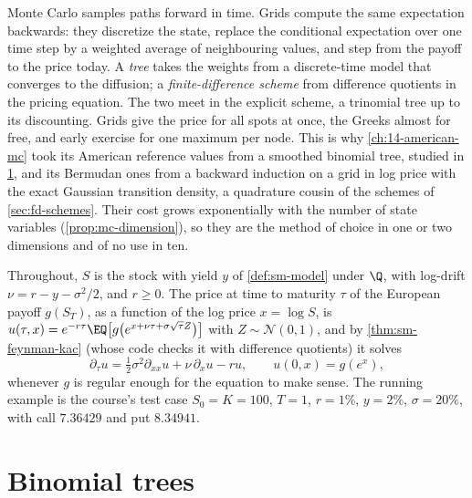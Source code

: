
Monte Carlo samples paths forward in time. Grids compute the same expectation backwards:
they discretize the state, replace the conditional expectation over one time step by a
weighted average of neighbouring values, and step from the payoff to the price today. A
\emph{tree} takes the weights from a discrete-time model that converges to the diffusion; a
\emph{finite-difference scheme} from difference quotients in the pricing equation. The two meet
in the explicit scheme, a trinomial tree up to its discounting. Grids give the price for all spots at once,
the Greeks almost for free, and early exercise for one maximum per node. This is why \cref{ch:14-american-mc} took its American reference values
from a smoothed binomial tree, studied in \cref{sec:fd-binomial}, and its Bermudan ones from a
backward induction on a grid in log price with the exact Gaussian transition density, a
quadrature cousin of the schemes of \cref{sec:fd-schemes}. Their cost grows exponentially with the number
of state variables (\cref{prop:mc-dimension}), so they are the method of choice in one or two
dimensions and of no use in ten.

Throughout, $S$ is the stock with yield $y$ of \cref{def:sm-model} under $\Q$, with log-drift
$\nu=r-y-\sigma^2/2$, and $r\ge0$. The price at time to maturity $\tau$ of the European payoff
$g(S_T)$, as a function of the log price $x=\log S$, is
$u(\tau,x)=e^{-r\tau}\EQ\big[g\big(e^{x+\nu\tau+\sigma\sqrt\tau Z}\big)\big]$ with $Z\sim\mathcal N(0,1)$, and by
\cref{thm:sm-feynman-kac} (whose code checks it with difference quotients) it solves
\begin{equation}\label{eq:fd-pde}
  \partial_\tau u=\tfrac12\sigma^2\partial_{xx}u+\nu\,\partial_xu-ru,\qquad u(0,x)=g(e^x),
\end{equation}
whenever $g$ is regular enough for the equation to make sense. The running example is the
course's test case $S_0=K=100$, $T=1$, $r=1\%$, $y=2\%$, $\sigma=20\%$, with call $7.36429$
and put $8.34941$.

\section{Binomial trees}\label{sec:fd-binomial}

